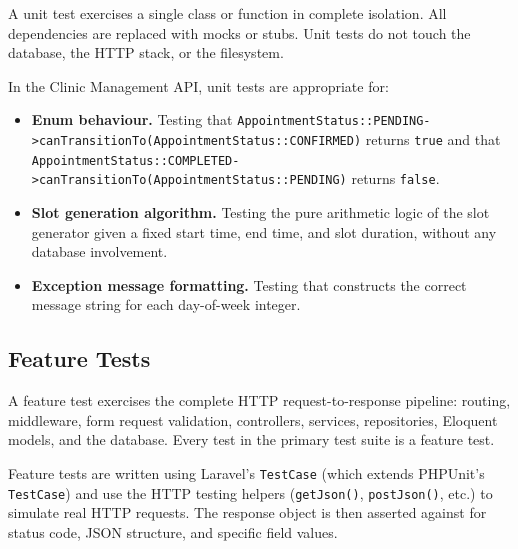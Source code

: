 A unit test exercises a single class or function in complete isolation.
All dependencies are replaced with mocks or stubs. Unit tests do not
touch the database, the HTTP stack, or the filesystem.

In the Clinic Management API, unit tests are appropriate for:

\begin{itemize}
  \item \textbf{Enum behaviour.} Testing that
    \texttt{AppointmentStatus::PENDING->canTransitionTo(AppointmentStatus::CONFIRMED)}
    returns \texttt{true} and that
    \texttt{AppointmentStatus::COMPLETED->canTransitionTo(AppointmentStatus::PENDING)}
    returns \texttt{false}.
  \item \textbf{Slot generation algorithm.} Testing the pure arithmetic
    logic of the slot generator given a fixed start time, end time, and
    slot duration, without any database involvement.
  \item \textbf{Exception message formatting.} Testing that
     constructs the correct message
    string for each day-of-week integer.
\end{itemize}

\subsection{Feature Tests}

A feature test exercises the complete HTTP request-to-response pipeline:
routing, middleware, form request validation, controllers, services,
repositories, Eloquent models, and the database. Every test in the
primary test suite is a feature test.

Feature tests are written using Laravel's \texttt{TestCase} (which
extends PHPUnit's \texttt{TestCase}) and use the HTTP testing helpers
(\texttt{getJson()}, \texttt{postJson()}, etc.) to simulate real HTTP
requests. The response object is then asserted against for status code,
JSON structure, and specific field values.

